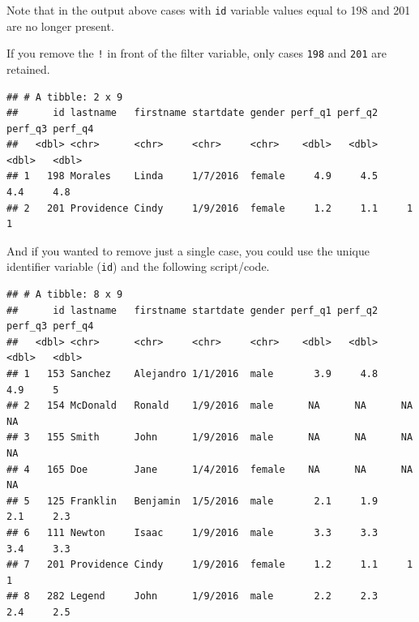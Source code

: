 \documentclass[]{book}
\newenvironment{Shaded}{\begin{snugshade}}{\end{snugshade}}
\newcommand{\KeywordTok}[1]{\textcolor[rgb]{0.13,0.29,0.53}{\textbf{#1}}}
\newcommand{\DecValTok}[1]{\textcolor[rgb]{0.00,0.00,0.81}{#1}}
\newcommand{\StringTok}[1]{\textcolor[rgb]{0.31,0.60,0.02}{#1}}
\newcommand{\CommentTok}[1]{\textcolor[rgb]{0.56,0.35,0.01}{\textit{#1}}}
\newcommand{\OperatorTok}[1]{\textcolor[rgb]{0.81,0.36,0.00}{\textbf{#1}}}
\newcommand{\NormalTok}[1]{#1}
\begin{document}
Note that in the output above cases with \texttt{id} variable values
equal to 198 and 201 are no longer present.

If you remove the \texttt{!} in front of the filter variable, only cases
\texttt{198} and \texttt{201} are retained.

\begin{Shaded}
\end{Shaded}

\begin{verbatim}
## # A tibble: 2 x 9
##      id lastname   firstname startdate gender perf_q1 perf_q2 perf_q3 perf_q4
##   <dbl> <chr>      <chr>     <chr>     <chr>    <dbl>   <dbl>   <dbl>   <dbl>
## 1   198 Morales    Linda     1/7/2016  female     4.9     4.5     4.4     4.8
## 2   201 Providence Cindy     1/9/2016  female     1.2     1.1     1       1
\end{verbatim}

And if you wanted to remove just a single case, you could use the unique
identifier variable (\texttt{id}) and the following script/code.

\begin{Shaded}
\end{Shaded}

\begin{verbatim}
## # A tibble: 8 x 9
##      id lastname   firstname startdate gender perf_q1 perf_q2 perf_q3 perf_q4
##   <dbl> <chr>      <chr>     <chr>     <chr>    <dbl>   <dbl>   <dbl>   <dbl>
## 1   153 Sanchez    Alejandro 1/1/2016  male       3.9     4.8     4.9     5  
## 2   154 McDonald   Ronald    1/9/2016  male      NA      NA      NA      NA  
## 3   155 Smith      John      1/9/2016  male      NA      NA      NA      NA  
## 4   165 Doe        Jane      1/4/2016  female    NA      NA      NA      NA  
## 5   125 Franklin   Benjamin  1/5/2016  male       2.1     1.9     2.1     2.3
## 6   111 Newton     Isaac     1/9/2016  male       3.3     3.3     3.4     3.3
## 7   201 Providence Cindy     1/9/2016  female     1.2     1.1     1       1  
## 8   282 Legend     John      1/9/2016  male       2.2     2.3     2.4     2.5
\end{verbatim}
\end{document}
